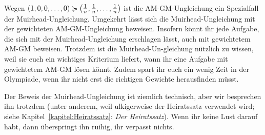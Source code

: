 Wegen $(1,0,0,\dotsc,0)\succcurlyeq \parens[\big]{\frac1n,\frac1n,\dotsc,\frac1n}$ ist die AM-GM-Ungleichung ein Spezialfall der Muirhead-Ungleichung. Umgekehrt lässt sich die Muirhead-Ungleichung mit der gewichteten AM-GM-Ungleichung beweisen. Insofern könnt ihr jede Aufgabe, die sich mit der Muirhead-Ungleichung erschlagen lässt, auch mit gewichtetem AM-GM beweisen. Trotzdem ist die Muirhead-Un-gleichung nützlich zu wissen, weil sie euch ein wichtiges Kriterium liefert, wann ihr eine Aufgabe mit gewichtetem AM-GM lösen könnt. Zudem spart ihr euch ein wenig Zeit in der Olympiade, wenn ihr nicht erst die richtigen Gewichte herausfinden müsst.

Der Beweis der Muirhead-Ungleichung ist ziemlich technisch, aber wir besprechen ihn trotzdem (unter anderem, weil ulkigerweise der Heiratssatz verwendet wird; siehe Kapitel~\ref{kapitel:Heiratssatz}: \emph{Der Heiratssatz}). Wenn ihr keine Lust darauf habt, dann überspringt ihn ruihig, ihr verpasst nichts.

